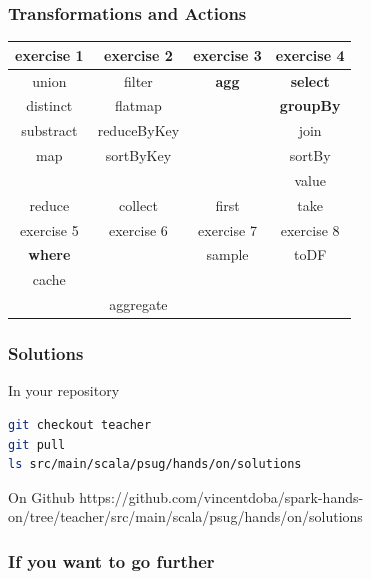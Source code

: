\documentclass[slidetop,9pt,utf8]{beamer}
\begin{document}
\begin{CJK}{UTF8}{gbsn}
\begin{frame}

  \frametitle{Transformations and Actions}
  
  \LARGE
  \begin{center}
    \begin{tabular}{|c|c|c|c|}
      \hline
      \rowcolor{gray} exercise 1 & exercise 2 & exercise 3 & exercise 4 \\ \hline
      union & filter & \textbf{agg} & \textbf{select} \\
      distinct & flatmap & & \textbf{groupBy} \\
      substract & reduceByKey & & join \\
      map & sortByKey & & sortBy \\ 
       & & & value \\ \hline
      \rowcolor{lightgray} reduce & collect & first & take \\ \hline
      \rowcolor{gray} exercise 5 & exercise 6 & exercise 7 & exercise 8 \\ \hline
      \textbf{where} & & sample & toDF \\
      cache & & & \\ \hline
      \rowcolor{lightgray}   & aggregate & & \\ \hline
    \end{tabular}
  \end{center}
  \normalsize
\end{frame}

\begin{frame}[fragile]
  \frametitle{Solutions}

  \begin{block}{In your repository}

    \begin{lstlisting}[language=bash, style=terminal-large]
git checkout teacher
git pull
ls src/main/scala/psug/hands/on/solutions 
    \end{lstlisting}
  
  \end{block}

  \begin{block}{On Github}
    https://github.com/vincentdoba/spark-hands-on/tree/teacher/src/main/scala/psug/hands/on/solutions
  \end{block}

\end{frame}

\begin{frame}
  \frametitle{If you want to go further}


\end{frame}
\end{CJK}
\end{document}

